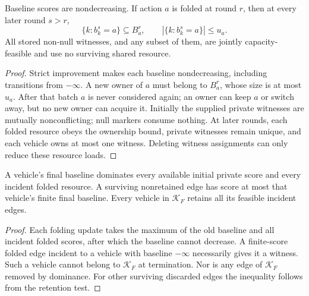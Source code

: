 \begin{lemma}
\label{lem:outside_invariant}
Baseline scores are nondecreasing. If action $a$ is folded at round
$r$, then at every later round $s>r$,
\begin{equation}
\{k:b_k^s=a\}\subseteq B_a^r,\qquad
|\{k:b_k^s=a\}|\le u_a.
\label{eq:outside_owners}
\end{equation}
All stored non-null witnesses, and any subset of them, are jointly
capacity-feasible and use no surviving shared resource.
\end{lemma}
\begin{proof}
Strict improvement makes each baseline nondecreasing, including
transitions from $-\infty$. A new owner of $a$ must belong to
$B_a^r$, whose size is at most $u_a$. After that batch $a$ is never
considered again; an owner can keep $a$ or switch away, but no new
owner can acquire it. Initially the supplied private witnesses are
mutually nonconflicting; null markers consume nothing. At later
rounds, each folded resource obeys the ownership bound, private
witnesses remain unique, and each vehicle owns at most one witness.
Deleting witness assignments can only reduce these resource loads.
\end{proof}

\begin{lemma}
\label{lem:folded_domination}
A vehicle's final baseline dominates every available initial private
score and every incident folded resource. A surviving nonretained
edge has score at most that vehicle's finite final baseline. Every
vehicle in $\mathcal K_F$ retains all its feasible incident edges.
\end{lemma}
\begin{proof}
Each folding update takes the maximum of the old baseline and all
incident folded scores, after which the baseline cannot decrease.
A finite-score folded edge incident to a vehicle with baseline
$-\infty$ necessarily gives it a witness. Such a vehicle cannot belong
to $\mathcal K_F$ at termination. Nor is any edge of $\mathcal K_F$
removed by dominance. For other surviving discarded edges the
inequality follows from the retention test.
\end{proof}

